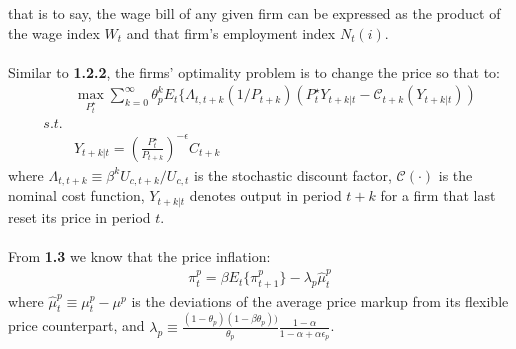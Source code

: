 \documentclass{article}
\numberwithin{equation}{section}
\begin{document}
that is to say, the wage bill of any given firm can be expressed as the product of the wage index $W_t$ and that firm's employment index $N_t(i)$.\\\\
Similar to \textbf{1.2.2}, the firms' optimality problem is to change the price so that to:
	\begin{align*}
		&\max\limits_{P^\star_t} \sum\limits^\infty_{k=0} \theta^k_p E_t\{ \Lambda_{t,t+k} (1/P_{t+k}) (P^\star_t Y_{t+k|t} - \mathscr{C}_{t+k}(Y_{t+k|t}))\\
		s.t.&\\
		&Y_{t+k|t} = \left( \frac{P^\star_t}{P_{t+k}} \right)^{-\epsilon} C_{t+k}
	\end{align*}
where $\Lambda_{t,t+k} \equiv \beta^k U_{c,t+k}/U_{c,t}$ is the stochastic discount factor, $\mathscr{C}(\cdot)$ is the nominal cost function, $Y_{t+k|t}$ denotes output in period $t+k$ for a firm that last reset its price in period $t$.\\\\
From \textbf{1.3} we know that the price inflation:
	\begin{align}
		\pi^p_t = \beta E_t\{ \pi^p_{t+1} \} - \lambda_p \hat{\mu}^p_t \label{4.1.1-4}
	\end{align}
where $\hat{\mu}^p_t \equiv \mu^p_t - \mu^p$ is the deviations of the average price markup from its flexible price counterpart, and $\lambda_p \equiv \frac{(1 - \theta_p)(1 - \beta\theta_p))}{\theta_p} \frac{1 - \alpha}{1 - \alpha + \alpha\epsilon_p}$.
\end{document}
